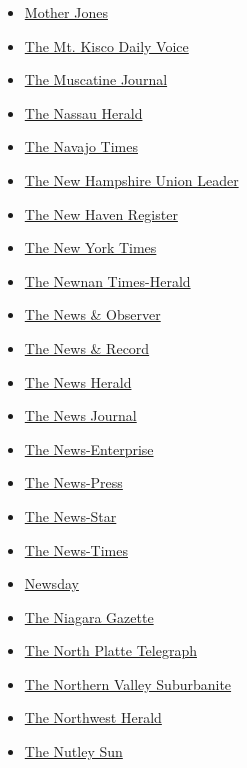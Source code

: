 \begin{itemize}
\item
  \href{https://www.motherjones.com/}{Mother Jones}
\item
  \href{https://dailyvoice.com/new-york/mtkisco/}{The Mt. Kisco Daily
  Voice}
\item
  \href{https://muscatinejournal.com/}{The Muscatine Journal}
\item
  \href{https://www.liherald.com/fivetowns/}{The Nassau Herald}
\item
  \href{https://navajotimes.com/}{The Navajo Times}
\item
  \href{https://www.unionleader.com/}{The New Hampshire Union Leader}
\item
  \href{https://www.nhregister.com/}{The New Haven Register}
\item
  \href{https://www.nytimes.com/}{The New York Times}
\item
  \href{https://times-herald.com/}{The Newnan Times-Herald}
\item
  \href{https://www.newsobserver.com/}{The News \& Observer}
\item
  \href{https://www.greensboro.com/}{The News \& Record}
\item
  \href{https://www.morganton.com/}{The News Herald}
\item
  \href{https://www.delawareonline.com/}{The News Journal}
\item
  \href{https://www.thenewsenterprise.com/}{The News-Enterprise}
\item
  \href{https://www.news-press.com/}{The News-Press}
\item
  \href{https://www.thenewsstar.com/}{The News-Star}
\item
  \href{https://www.newstimes.com/}{The News-Times}
\item
  \href{https://www.newsday.com/}{Newsday}
\item
  \href{https://www.niagara-gazette.com/}{The Niagara Gazette}
\item
  \href{https://www.nptelegraph.com/}{The North Platte Telegraph}
\item
  \href{http://northernvalleysuburbanite.newspaperdirect.com/epaper/viewer.aspx?newspaper=northern+valley+suburbanite+-+north+edition\&cid=7705\&google=1}{The
  Northern Valley Suburbanite}
\item
  \href{https://www.nwherald.com/}{The Northwest Herald}
\item
  \href{http://nutleysun.newspaperdirect.com/epaper/viewer.aspx?newspaper=nutley+sun\&cid=7704\&google=1}{The
  Nutley Sun}

\end{itemize}
